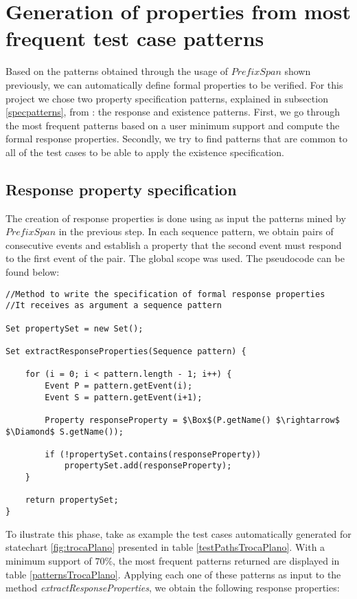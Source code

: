 \section{Generation of properties from most frequent test case patterns}
\label{genproppatterns}

Based on the patterns obtained through the usage of $PrefixSpan$ shown previously, we can automatically define formal properties to be verified. For this project we chose two property specification patterns, explained in subsection \ref{specpatterns}, from \cite{dwyer98}: the response and existence patterns. First, we go through the most frequent patterns based on a user minimum support and compute the formal response properties. Secondly, we  try to find patterns that are common to all of the test cases to be able to apply the existence specification.

\subsection{Response property specification}

The creation of response properties is done using as input the patterns mined by $PrefixSpan$ in the previous step. In each sequence pattern, we obtain pairs of consecutive events and establish a property that the second event must respond to the first event of the pair. The global scope was used. The pseudocode can be found below:

\begin{lstlisting}[mathescape]
//Method to write the specification of formal response properties
//It receives as argument a sequence pattern 

Set propertySet = new Set();

Set extractResponseProperties(Sequence pattern) {

	for (i = 0; i < pattern.length - 1; i++) {
		Event P = pattern.getEvent(i);
		Event S = pattern.getEvent(i+1);

		Property responseProperty = $\Box$(P.getName() $\rightarrow$ $\Diamond$ S.getName());

		if (!propertySet.contains(responseProperty))
			propertySet.add(responseProperty);
	}

	return propertySet;
}
\end{lstlisting}

To ilustrate this phase, take as example the test cases automatically generated for statechart \ref{fig:trocaPlano} presented in table \ref{testPathsTrocaPlano}. With a minimum support of $70\%$, the most frequent patterns returned are displayed in table \ref{patternsTrocaPlano}. Applying each one of these patterns as input to the method \textit{extractResponseProperties}, we obtain the following response properties:

